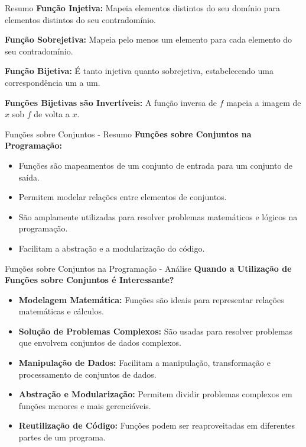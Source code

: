   \begin{frame}{Resumo}
    \textbf{Função Injetiva:} Mapeia elementos distintos do seu domínio para elementos distintos do seu contradomínio.
  
    \textbf{Função Sobrejetiva:} Mapeia pelo menos um elemento para cada elemento do seu contradomínio.
  
    \textbf{Função Bijetiva:} É tanto injetiva quanto sobrejetiva, estabelecendo uma correspondência um a um.
  
    \textbf{Funções Bijetivas são Invertíveis:} A função inversa de $f$ mapeia a imagem de $x$ sob $f$ de volta a $x$.
  \end{frame}

  \begin{frame}{Funções sobre Conjuntos - Resumo}
    \textbf{Funções sobre Conjuntos na Programação:}
    
    \begin{itemize}
      \item Funções são mapeamentos de um conjunto de entrada para um conjunto de saída.
      \item Permitem modelar relações entre elementos de conjuntos.
      \item São amplamente utilizadas para resolver problemas matemáticos e lógicos na programação.
      \item Facilitam a abstração e a modularização do código.
    \end{itemize}
  \end{frame}
  
  \begin{frame}{Funções sobre Conjuntos na Programação - Análise}
    \textbf{Quando a Utilização de Funções sobre Conjuntos é Interessante?}
    
    \begin{itemize}
      \item \textbf{Modelagem Matemática:} Funções são ideais para representar relações matemáticas e cálculos.
      
      \item \textbf{Solução de Problemas Complexos:} São usadas para resolver problemas que envolvem conjuntos de dados complexos.
      
      \item \textbf{Manipulação de Dados:} Facilitam a manipulação, transformação e processamento de conjuntos de dados.
      
      \item \textbf{Abstração e Modularização:} Permitem dividir problemas complexos em funções menores e mais gerenciáveis.
      
      \item \textbf{Reutilização de Código:} Funções podem ser reaproveitadas em diferentes partes de um programa.
    \end{itemize}
  \end{frame}
    